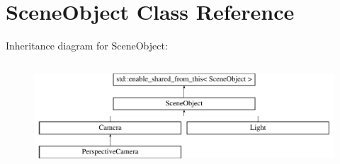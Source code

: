 \hypertarget{class_scene_object}{}\section{Scene\+Object Class Reference}
\label{class_scene_object}
Inheritance diagram for Scene\+Object\+:\begin{figure}[H]
\begin{center}
\leavevmode
\includegraphics[height=3.985765cm]{class_scene_object}
\end{center}
\end{figure}
